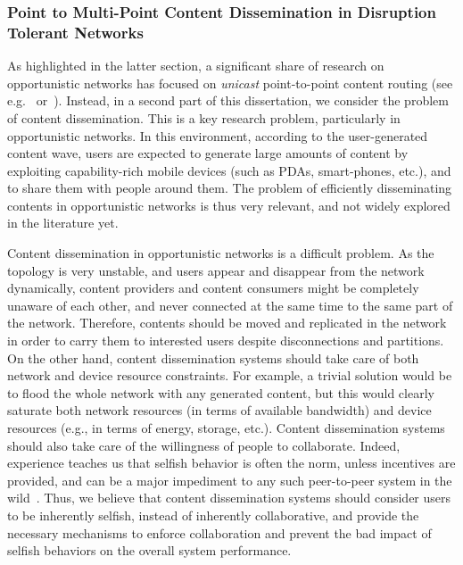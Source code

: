 \subsubsection{Point to Multi-Point Content Dissemination in Disruption Tolerant Networks}

As highlighted in the latter section, a significant share of research on opportunistic networks has focused on \emph{unicast} point-to-point content routing (see e.g.~\cite{DTNTaxonomy} or~\cite{Passarella:Survey}). Instead, in a second part of this dissertation, we consider the problem of content dissemination. This is a key research problem, 
particularly in opportunistic networks. In this environment, according to the user-generated content wave, users are expected to generate large amounts of content 
by exploiting capability-rich mobile devices (such as PDAs, smart-phones, etc.), and to share them with people around them.  The problem of efficiently disseminating contents in opportunistic networks is thus very relevant, and not widely explored in the literature yet.
 
Content dissemination in opportunistic networks is a difficult problem. As the topology is very unstable, and users appear and disappear from the network dynamically, content providers and content consumers might be completely unaware of each other, and never connected at the same 
time to the same part of the network. Therefore, contents should be moved and replicated in the network in order to carry them to interested users despite disconnections 
and partitions. On the other hand, content dissemination systems should take care of both network and device resource constraints.
For example, a trivial solution would be to flood the whole network with any generated content, but this would clearly saturate both network resources (in terms of available bandwidth) and device resources (e.g., in terms of energy, storage, etc.). Content dissemination systems should also take care of the willingness of people to collaborate. Indeed,  
experience teaches us that selfish behavior is often the norm, unless incentives are provided, and can be a major impediment to any such peer-to-peer system in the wild~\cite{NashEquilibria}. Thus, we believe that content dissemination systems should consider users to be inherently selfish, instead of inherently collaborative, and provide the necessary mechanisms to enforce collaboration and prevent the bad impact of selfish behaviors on the overall system performance.  

